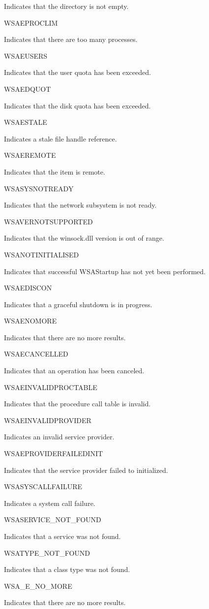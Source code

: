 Indicates that the directory is not empty.

WSAEPROCLIM

Indicates that there are too many processes.

WSAEUSERS

Indicates that the user quota has been exceeded.

WSAEDQUOT

Indicates that the disk quota has been exceeded.

WSAESTALE

Indicates a stale file handle reference.

WSAEREMOTE

Indicates that the item is remote.

WSASYSNOTREADY

Indicates that the network subsystem is not ready.

WSAVERNOTSUPPORTED

Indicates that the winsock.dll version is out of range.

WSANOTINITIALISED

Indicates that successful WSAStartup has not yet been performed.

WSAEDISCON

Indicates that a graceful shutdown is in progress.

WSAENOMORE

Indicates that there are no more results.

WSAECANCELLED

Indicates that an operation has been canceled.

WSAEINVALIDPROCTABLE

Indicates that the procedure call table is invalid.

WSAEINVALIDPROVIDER

Indicates an invalid service provider.

WSAEPROVIDERFAILEDINIT

Indicates that the service provider failed to initialized.

WSASYSCALLFAILURE

Indicates a system call failure.

WSASERVICE\_NOT\_FOUND

Indicates that a service was not found.

WSATYPE\_NOT\_FOUND

Indicates that a class type was not found.

WSA\_E\_NO\_MORE

Indicates that there are no more results.

